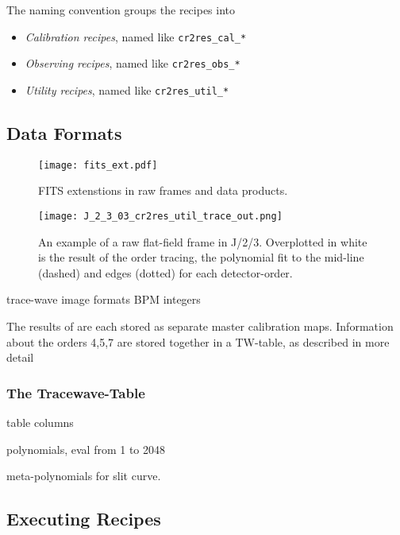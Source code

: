 The naming convention groups the recipes into
\begin{itemize}
    \item \textit{Calibration recipes}, named like \texttt{cr2res\_cal\_*}
    \item \textit{Observing recipes}, named like \texttt{cr2res\_obs\_*}
    \item \textit{Utility recipes}, named like \texttt{cr2res\_util\_*}
\end{itemize}

\subsection{Data Formats}
\label{sec:data-fmt-quick}

\begin{figure}[!tb]
  \begin{center}
    \texttt{[image: fits\_ext.pdf]}
  \end{center}
  \caption{
    \label{fig:fits_ext}
    FITS extenstions in raw frames and data products.
    }
\end{figure}


\begin{figure}[!tb]
  \begin{center}
    \texttt{[image: J\_2\_3\_03\_cr2res\_util\_trace\_out.png]}
  \end{center}
  \caption{
    \label{fig:flat_trace}
    An example of a raw flat-field frame in J/2/3. Overplotted in white is 
    the result of the order tracing, the polynomial fit to the mid-line
    (dashed) and edges (dotted) for each detector-order.
    }
\end{figure}

trace-wave
image formats
BPM integers


The results of %
are each stored as separate master calibration maps. Information about the orders 4,5,7 are stored together in a TW-table, as described in more detail %

\subsubsection{The Tracewave-Table}
\label{sec:tracewave}

table columns

polynomials, eval from 1 to 2048

meta-polynomials for slit curve.

\subsection{Executing Recipes}
\label{sec:exec-recipes-quick}



